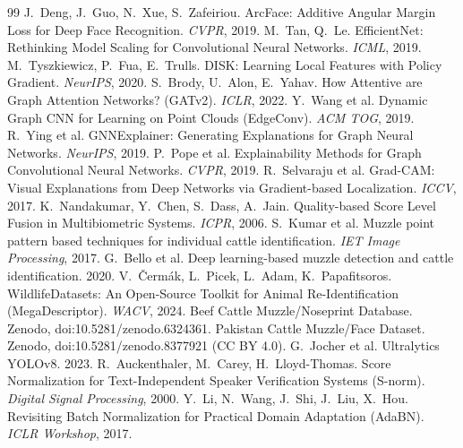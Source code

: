 \documentclass[11pt]{article}
\begin{document}
\begin{thebibliography}{99}\small
{} J.\ Deng, J.\ Guo, N.\ Xue, S.\ Zafeiriou. ArcFace: Additive Angular Margin Loss for Deep Face Recognition. \emph{CVPR}, 2019.
 M.\ Tan, Q.\ Le. EfficientNet: Rethinking Model Scaling for Convolutional Neural Networks. \emph{ICML}, 2019.
 M.\ Tyszkiewicz, P.\ Fua, E.\ Trulls. DISK: Learning Local Features with Policy Gradient. \emph{NeurIPS}, 2020.
 S.\ Brody, U.\ Alon, E.\ Yahav. How Attentive are Graph Attention Networks? (GATv2). \emph{ICLR}, 2022.
 Y.\ Wang et al. Dynamic Graph CNN for Learning on Point Clouds (EdgeConv). \emph{ACM TOG}, 2019.
 R.\ Ying et al. GNNExplainer: Generating Explanations for Graph Neural Networks. \emph{NeurIPS}, 2019.
 P.\ Pope et al. Explainability Methods for Graph Convolutional Neural Networks. \emph{CVPR}, 2019.
 R.\ Selvaraju et al. Grad-CAM: Visual Explanations from Deep Networks via Gradient-based Localization. \emph{ICCV}, 2017.
 K.\ Nandakumar, Y.\ Chen, S.\ Dass, A.\ Jain. Quality-based Score Level Fusion in Multibiometric Systems. \emph{ICPR}, 2006.
 S.\ Kumar et al. Muzzle point pattern based techniques for individual cattle identification. \emph{IET Image Processing}, 2017.
 G.\ Bello et al. Deep learning-based muzzle detection and cattle identification. 2020.
 V.\ \v{C}erm\'ak, L.\ Picek, L.\ Adam, K.\ Papafitsoros. WildlifeDatasets: An Open-Source Toolkit for Animal Re-Identification (MegaDescriptor). \emph{WACV}, 2024.
 Beef Cattle Muzzle/Noseprint Database. Zenodo, doi:10.5281/zenodo.6324361.
 Pakistan Cattle Muzzle/Face Dataset. Zenodo, doi:10.5281/zenodo.8377921 (CC BY 4.0).
 G.\ Jocher et al. Ultralytics YOLOv8. 2023.
 R.\ Auckenthaler, M.\ Carey, H.\ Lloyd-Thomas. Score Normalization for Text-Independent Speaker Verification Systems (S-norm). \emph{Digital Signal Processing}, 2000.
 Y.\ Li, N.\ Wang, J.\ Shi, J.\ Liu, X.\ Hou. Revisiting Batch Normalization for Practical Domain Adaptation (AdaBN). \emph{ICLR Workshop}, 2017.
\end{thebibliography}
\end{document}
